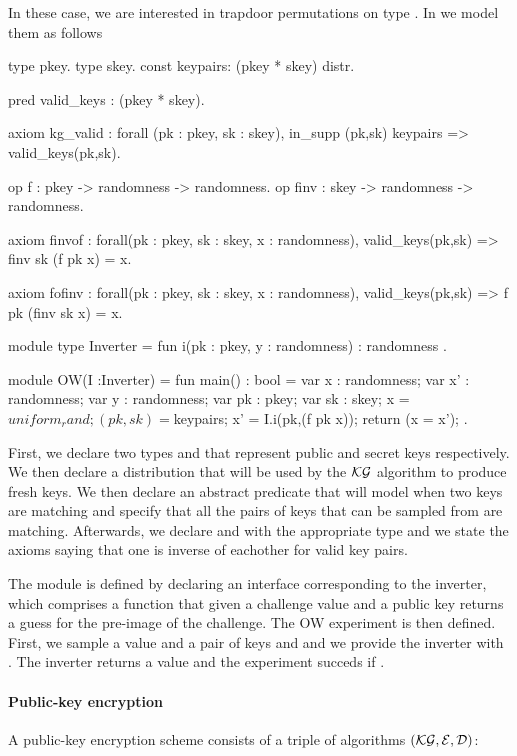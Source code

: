 In these case, we are interested in trapdoor permutations on type
. In \EC we model them as follows
\begin{easycrypt}[label={lst:owf}]{}
type pkey.
type skey.
const keypairs: (pkey * skey) distr.

pred valid_keys : (pkey * skey).

axiom kg_valid : forall (pk : pkey, sk : skey), 
in_supp (pk,sk) keypairs => valid_keys(pk,sk).

op f : pkey -> randomness -> randomness.
op finv : skey -> randomness -> randomness.


axiom finvof : forall(pk : pkey, sk : skey, x : randomness),
 valid_keys(pk,sk) => finv sk (f pk x) = x.

axiom fofinv : forall(pk : pkey, sk : skey, x : randomness),
 valid_keys(pk,sk) => f pk (finv sk x) = x.

module type Inverter = {
 fun i(pk : pkey, y : randomness) : randomness
}.

module OW(I :Inverter) ={
 fun main() : bool ={
 var x : randomness;
 var x' : randomness;
 var y : randomness;
 var pk : pkey;
 var sk : skey;
  x = $uniform_rand;
  (pk,sk) = $keypairs;
  x'  = I.i(pk,(f pk x));
  return (x = x');
 }
}.

\end{easycrypt}
First, we declare two types  and  that represent
public and secret keys respectively. We then declare a distribution
 that will be used by the $\mathcal{KG}$ algorithm to produce fresh
keys. We then declare an abstract predicate that will model when two
keys are matching and specify that all the pairs of keys that can be
sampled from  are matching. Afterwards, we declare 
and  with the appropriate type and we state the axioms saying
that one is inverse of eachother for valid key pairs.
 
The module  is defined by declaring an interface corresponding
to the inverter, which comprises a function that given a challenge
value and a public key returns a guess for the pre-image of the
challenge. The OW experiment is then defined. First, we sample a value
 and a pair of keys  and  and we provide the
inverter with . The inverter returns a value  and
the experiment succeds if .

\paragraph{Public-key encryption}
A public-key encryption scheme consists of a triple of algorithms
$(\mathcal{KG},\mathcal{E},\mathcal{D})$:

